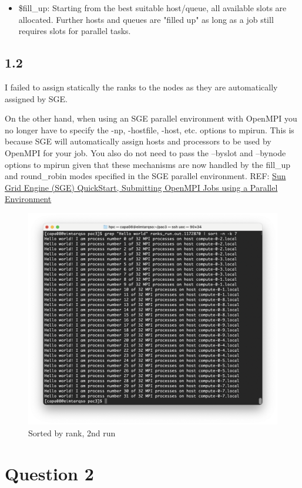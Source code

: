 \documentclass[12pt]{article}
\begin{document}
\begin{itemize}
	\item \$fill\_up: Starting from the best  suitable  host/queue,  all available  slots  are allocated. Further hosts and queues are "filled up" as  long  as  a  job  still requires slots for parallel tasks.
\end{itemize}

\subsection*{1.2}

I failed to assign statically the ranks to the nodes as they are automatically assigned by SGE.

On the other hand, when using an SGE parallel environment with OpenMPI you no longer have to specify the -np, -hostfile, -host, etc. options to mpirun. This is because SGE will automatically assign hosts and processors to be used by OpenMPI for your job. You also do not need to pass the –byslot and –bynode options to mpirun given that these mechanisms are now handled by the fill\_up and round\_robin modes specified in the SGE parallel environment. REF: \href{http://star.mit.edu/cluster/docs/0.93.3/guides/sge.html}{Sun Grid Engine (SGE) QuickStart, Submitting OpenMPI Jobs using a Parallel Environment}

\newpage

\begin{figure}[h!]
	\centering
	\includegraphics[width=0.8\linewidth]{images/Q1.2.png}
	\caption{Sorted by rank, 2nd run}
	\label{fig:Q1B}
\end{figure}

\section*{Question 2}
\end{document}
